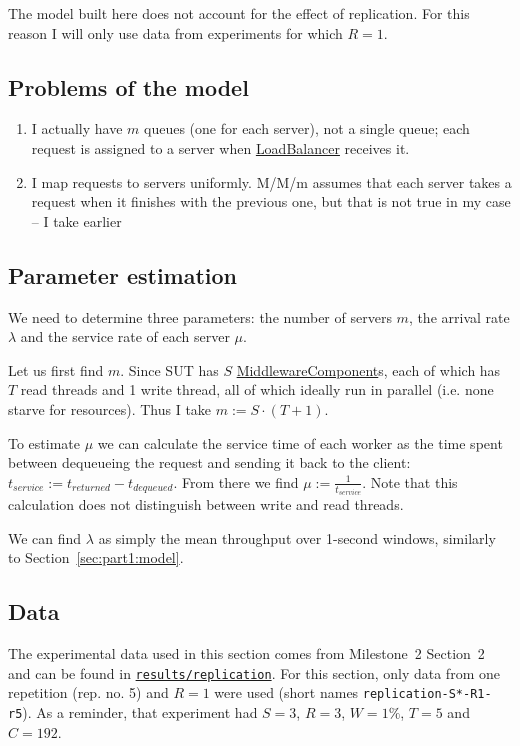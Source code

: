 \documentclass[11pt]{article}
\newcommand{\todo}[1]{\fcolorbox{black}{Apricot}{TODO: #1}}
\newcommand{\linkmain}[1]{\href{https://gitlab.inf.ethz.ch/pungast/asl-fall16-project/blob/master/src/main/java/asl/#1.java}{#1}}
\begin{document}
The model built here does not account for the effect of replication. For this reason I will only use data from experiments for which $R=1$.

\subsection{Problems of the model}
\todo{}

\begin{enumerate}
	\item I actually have $m$ queues (one for each server), not a single queue; each request is assigned to a server when \linkmain{LoadBalancer} receives it.
	\item I map requests to servers uniformly. M/M/m assumes that each server takes a request when it finishes with the previous one, but that is not true in my case -- I take earlier
\end{enumerate}

\subsection{Parameter estimation}

We need to determine three parameters: the number of servers $m$, the arrival rate $\lambda$ and the service rate of each server $\mu$.

Let us first find $m$. Since SUT has $S$ \linkmain{MiddlewareComponent}s, each of which has $T$ read threads and 1 write thread, all of which ideally run in parallel (i.e. none starve for resources). Thus I take $m := S \cdot (T + 1)$.

To estimate $\mu$ we can calculate the service time of each worker as the time spent between dequeueing the request and sending it back to the client: $t_{service} := t_{returned} - t_{dequeued}$. From there we find $\mu := \frac{1}{t_{service}}$. Note that this calculation does not distinguish between write and read threads.

We can find $\lambda$ as simply the mean throughput over 1-second windows, similarly to Section~\ref{sec:part1:model}.


\subsection{Data}

The experimental data used in this section comes from Milestone~2 Section~2 and can be found in \texttt{\href{https://gitlab.inf.ethz.ch/pungast/asl-fall16-project/tree/master/results/replication}{results/replication}}. For this section, only data from one repetition (rep. no. 5) and $R=1$ were used (short names \texttt{replication-S*-R1-r5}). As a reminder, that experiment had \todo{} $S=3$, $R=3$, $W=1\%$, $T=5$ and $C=192$.
\end{document}
